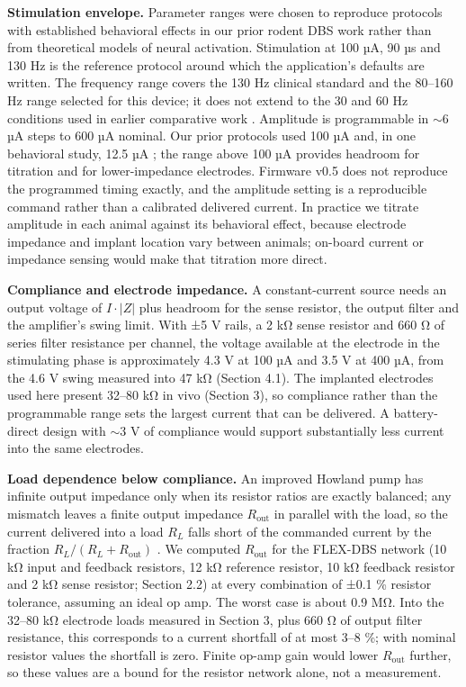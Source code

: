 \textbf{Stimulation envelope.} Parameter ranges were chosen to reproduce protocols with established behavioral effects in our prior rodent DBS work rather than from theoretical models of neural activation. Stimulation at 100 µA, 90 µs and 130 Hz \citep{creed2012egr,creed2013} is the reference protocol around which the application's defaults are written. The frequency range covers the 130 Hz clinical standard and the 80--160 Hz range selected for this device; it does not extend to the 30 and 60 Hz conditions used in earlier comparative work \citep{creed2011}. Amplitude is programmable in $\sim$6 µA steps to 600 µA nominal. Our prior protocols used 100 µA \citep{creed2012egr,creed2013} and, in one behavioral study, 12.5 µA \citep{aleksandrova2013}; the range above 100 µA provides headroom for titration and for lower-impedance electrodes. Firmware v0.5 does not reproduce the programmed timing exactly, and the amplitude setting is a reproducible command rather than a calibrated delivered current. In practice we titrate amplitude in each animal against its behavioral effect, because electrode impedance and implant location vary between animals; on-board current or impedance sensing would make that titration more direct.

\textbf{Compliance and electrode impedance.} A constant-current source needs an output voltage of $I\cdot|Z|$ plus headroom for the sense resistor, the output filter and the amplifier's swing limit. With ±5 V rails, a 2 kΩ sense resistor and 660 Ω of series filter resistance per channel, the voltage available at the electrode in the stimulating phase is approximately 4.3 V at 100 µA and 3.5 V at 400 µA, from the 4.6 V swing measured into 47 kΩ (Section 4.1). The implanted electrodes used here present 32--80 kΩ in vivo (Section 3), so compliance rather than the programmable range sets the largest current that can be delivered. A battery-direct design with $\sim$3 V of compliance would support substantially less current into the same electrodes.

\textbf{Load dependence below compliance.} An improved Howland pump has infinite output impedance only when its resistor ratios are exactly balanced; any mismatch leaves a finite output impedance $R_\mathrm{out}$ in parallel with the load, so the current delivered into a load $R_L$ falls short of the commanded current by the fraction $R_L/(R_L + R_\mathrm{out})$ \citep{tucker2013}. We computed $R_\mathrm{out}$ for the FLEX-DBS network (10 kΩ input and feedback resistors, 12 kΩ reference resistor, 10 kΩ feedback resistor and 2 kΩ sense resistor; Section 2.2) at every combination of ±0.1 \% resistor tolerance, assuming an ideal op amp. The worst case is about 0.9 MΩ. Into the 32--80 kΩ electrode loads measured in Section 3, plus 660 Ω of output filter resistance, this corresponds to a current shortfall of at most 3--8 \%; with nominal resistor values the shortfall is zero. Finite op-amp gain would lower $R_\mathrm{out}$ further, so these values are a bound for the resistor network alone, not a measurement.

